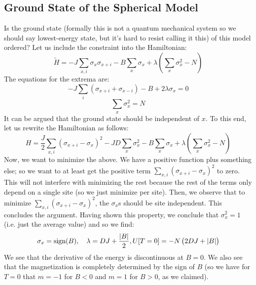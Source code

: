 \subsection{Ground State of the Spherical Model}
Is the ground state (formally this is not a quantum mechanical system so we should say lowest-energy state, but it's hard to resist calling it this) of this model ordered? Let us include the constraint into the Hamiltonian:
\begin{equation}
    \tilde{H} = -J\sum_{x, i}\sigma_x \sigma_{x + i} - B \sum_x \sigma_x + \lambda \left(\sum_x \sigma_x^2 - N\right)
\end{equation}
The equations for the extrema are:
\begin{equation}
    -J\sum_i \left(\sigma_{x + i} + \sigma_{x - i}\right) - B + 2\lambda \sigma_x = 0
\end{equation}
\begin{equation}
    \sum_x \sigma_x^2 = N
\end{equation}
It can be argued that the ground state should be independent of $x$. To this end, let us rewrite the Hamiltonian as follows:
\begin{equation}
    H = \frac{J}{2}\sum_{x, i}\left(\sigma_{x + i} - \sigma_x\right)^2 - JD\sum_x \sigma_x^2 - B\sum_x \sigma_x + \lambda\left(\sum_x \sigma_x^2 - N\right)
\end{equation}
Now, we want to minimize the above. We have a positive function plus something else; so we want to at least get the positive term $\sum_{x, i}(\sigma_{x + i} - \sigma_x)^2$ to zero. This will not interfere with minimizing the rest because the rest of the terms only depend on a single site (so we just minimize per site). Then, we observe that to minimize $\sum_{x, i}(\sigma_{x + i} - \sigma_x)^2$, the $\sigma_x$s should be site independent. This concludes the argument. Having shown this property, we conclude that $\sigma_x^2 = 1$ (i.e. just the average value) and so we find:
\begin{equation}
    \sigma_x = \text{sign}(B), \quad \lambda = DJ + \frac{\lvert B \rvert}{2}, U[T = 0] = -N\left(2DJ + \lvert B \rvert\right)
\end{equation}
We see that the derivative of the energy is discontinuous at $B = 0$. We also see that the magnetization is completely determined by the sign of $B$ (so we have for $T = 0$ that $m = -1$ for $B < 0$ and $m = 1$ for $B > 0$, as we claimed). 

